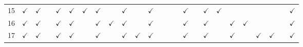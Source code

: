 \documentclass{article}
\newcommand\covered{\ensuremath{\checkmark}}
\begin{document}
\begin{table}[htbp]
\begin{minipage}[t]{\linewidth}
{\begin{tabular}{c *{24}{c}}
      15      & \covered & \covered &          & \covered & \covered & \covered & \covered &          & \covered &          & \covered &          &          &          & \covered &          & \covered & \covered &          &          &          &           &          & \covered     \\
      16      & \covered & \covered &          & \covered & \covered &          & \covered & \covered & \covered &          & \covered &          &          &          & \covered &          & \covered &          & \covered & \covered &          &           &          & \covered     \\
      17      & \covered & \covered &          & \covered & \covered &          & \covered &          & \covered & \covered & \covered &          &          &          & \covered &          & \covered &          & \covered &          & \covered & \covered  &          & \covered     \\
      \bottomrule
    \end{tabular}
  }
  \end{minipage}
\end{table}
\end{document}
